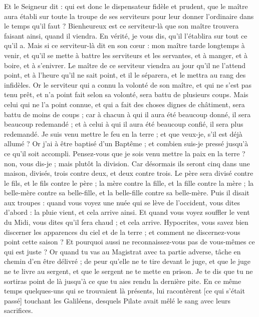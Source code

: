 \begin{multicols}{2}
Et le Seigneur dit : qui est donc le dispensateur fidèle et prudent, que le maître aura établi sur toute la troupe de ses serviteurs pour leur donner l'ordinaire dans le temps qu'il faut ?
Bienheureux est ce serviteur-là que son maître trouvera faisant ainsi, quand il viendra.
En vérité, je vous dis, qu'il l'établira sur tout ce qu'il a.
Mais si ce serviteur-là dit en son cœur : mon maître tarde longtemps à venir, et qu'il se mette à battre les serviteurs et les servantes, et à manger, et à boire, et à s'enivrer.
Le maître de ce serviteur viendra au jour qu'il ne l'attend point, et à l'heure qu'il ne sait point, et il le séparera, et le mettra au rang des infidèles.
Or le serviteur qui a connu la volonté de son maître, et qui ne s'est pas tenu prêt, et n'a point fait selon sa volonté, sera battu de plusieurs coups.
Mais celui qui ne l'a point connue, et qui a fait des choses dignes de châtiment, sera battu de moins de coups ; car à chacun à qui il aura été beaucoup donné, il sera beaucoup redemandé ; et à celui à qui il aura été beaucoup confié, il sera plus redemandé.
Je suis venu mettre le feu en la terre ; et que veux-je, s'il est déjà allumé ?
Or j'ai à être baptisé d'un Baptême ; et combien suis-je pressé jusqu'à ce qu'il soit accompli.
Pensez-vous que je sois venu mettre la paix en la terre ? non, vous dis-je ; mais plutôt la division.
Car désormais ils seront cinq dans une maison, divisés, trois contre deux, et deux contre trois.
Le père sera divisé contre le fils, et le fils contre le père ; la mère contre la fille, et la fille contre la mère ; la belle-mère contre sa belle-fille, et la belle-fille contre sa belle-mère.
Puis il disait aux troupes : quand vous voyez une nuée qui se lève de l'occident, vous dites d'abord : la pluie vient, et cela arrive ainsi.
Et quand vous voyez souffler le vent du Midi, vous dites qu'il fera chaud ; et cela arrive.
Hypocrites, vous savez bien discerner les apparences du ciel et de la terre ; et comment ne discernez-vous point cette saison ?
Et pourquoi aussi ne reconnaissez-vous pas de vous-mêmes ce qui est juste ?
Or quand tu vas au Magistrat avec ta partie adverse, tâche en chemin d'en être délivré ; de peur qu'elle ne te tire devant le juge, et que le juge ne te livre au sergent, et que le sergent ne te mette en prison.
Je te dis que tu ne sortiras point de là jusqu'à ce que tu aies rendu la dernière pite.
\VerseOne{}En ce même temps quelques-uns qui se trouvaient là présents, lui racontèrent [ce qui s'était passé] touchant les Galiléens, desquels Pilate avait mêlé le sang avec leurs sacrifices.

\end{multicols}
